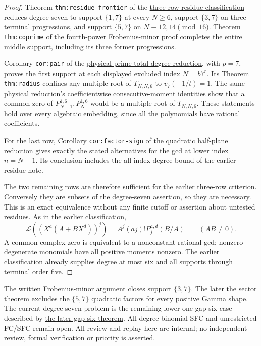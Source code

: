 \documentclass[11pt]{article}
\begin{document}
\begin{proof}
Theorem \texttt{thm:residue-frontier} of the
\href{ORDINARY_DEGREE_SEVEN_RESIDUE_FRONTIER.tex}{three-row residue classification}
reduces degree seven to support $\{1,7\}$ at every $N\ge6$,
support $\{3,7\}$ on three terminal progressions, and support
$\{5,7\}$ on $N\equiv12,14\pmod{16}$.
Theorem \texttt{thm:coprime} of the
\href{LOWER_THREE_FOURTH_POWER_FROBENIUS_SFC.tex}{fourth-power Frobenius-minor proof}
completes the entire middle support, including its three former
progressions.

Corollary \texttt{cor:pair} of the
\href{PHYSICAL_PRIME_TOTAL_DEGREE_REDUCTION.tex}{physical prime-total-degree reduction},
with $p=7$, proves the first support at each displayed excluded index
$N=b7^r$. Its Theorem \texttt{thm:radius} confines any multiple
root of $T_{N,N,6}$ to $v_7(-1/t)=1$.
The same physical reduction's coefficientwise consecutive-moment
identities show that a common zero of $P_{N-1}^{1,6},P_N^{1,6}$
would be a multiple root of $T_{N,N,6}$.
These statements hold over every algebraic embedding, since all the
polynomials have rational coefficients.

For the last row, Corollary \texttt{cor:factor-sign} of the
\href{LOWER_FIVE_QUADRATIC_HALF_PLANE_REDUCTION.tex}{quadratic half-plane reduction}
gives exactly the stated alternatives for the gcd at lower index
$n=N-1$. Its conclusion includes the all-index degree bound of the
earlier residue note.

The two remaining rows are therefore sufficient for the earlier
three-row criterion. Conversely they are subsets of the degree-seven
assertion, so they are necessary. This is an exact equivalence
without any finite cutoff or assertion about untested residues.
As in the earlier classification,
\[
 \mathcal L((X^a(A+BX^d))^j)=A^j(aj)!P_j^{a,d}(B/A)
 \qquad(AB\ne0).
\]
A common complex zero is equivalent to a nonconstant rational gcd;
nonzero degenerate monomials have all positive moments nonzero.
The earlier classification already supplies degree at most six and
all supports through terminal order five.
\end{proof}
The written Frobenius-minor argument closes support $\{3,7\}$.
The later \href{LOWER_FIVE_QUADRATIC_SECTOR_SFC.tex}{the sector theorem} excludes the $\{5,7\}$ quadratic factors
for every positive Gamma shape. The current degree-seven problem is the
remaining lower-one gap-six case described by \href{PHYSICAL_PRIME_ANALYTIC_INTERPOLATION.tex}{the later gap-six theorem}.
All-degree binomial SFC and unrestricted FC/SFC remain open. All review and replay here are internal;
no independent review, formal verification or priority is asserted.
\end{document}
